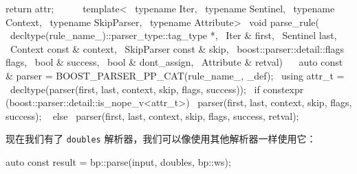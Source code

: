 \begin{code}
{{            return attr;                                                       \
        }                                                                      \
    }                                                                          \
                                                                               \
    template<                                                                  \
        typename Iter,                                                         \
        typename Sentinel,                                                     \
        typename Context,                                                      \
        typename SkipParser,                                                   \
        typename Attribute>                                                    \
    void parse_rule(                                                           \
        decltype(rule_name_)::parser_type::tag_type *,                         \
        Iter & first,                                                          \
        Sentinel last,                                                         \
        Context const & context,                                               \
        SkipParser const & skip,                                               \
        boost::parser::detail::flags flags,                                    \
        bool & success,                                                        \
        bool & dont_assign,                                                    \
        Attribute & retval)                                                    \
    {                                                                          \
        auto const & parser = BOOST_PARSER_PP_CAT(rule_name_, _def);           \
        using attr_t =                                                         \
            decltype(parser(first, last, context, skip, flags, success));      \
        if constexpr (boost::parser::detail::is_nope_v<attr_t>) {              \
            parser(first, last, context, skip, flags, success);                \
        } else {                                                               \
            parser(first, last, context, skip, flags, success, retval);        \
        }                                                                      \
    }
\end{code}
现在我们有了 \texttt{doubles} 解析器，我们可以像使用其他解析器一样使用它：

\begin{code}
auto const result = bp::parse(input, doubles, bp::ws);
\end{code}

